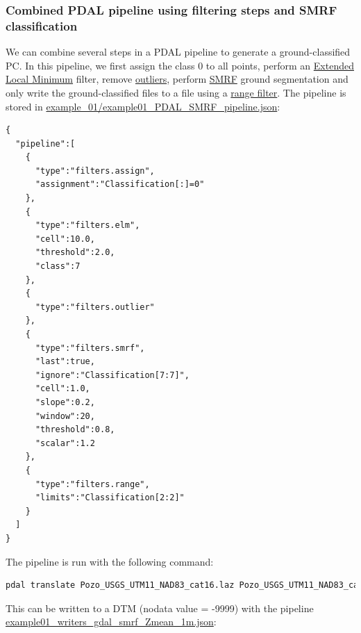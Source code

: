 \documentclass[a4paperpaper,,tablecaptionabove]{scrartcl}
\begin{document}
\hypertarget{combined-pdal-pipeline-using-filtering-steps-and-smrf-classification}{%
\subsubsection{Combined PDAL pipeline using filtering steps and SMRF
classification}\label{combined-pdal-pipeline-using-filtering-steps-and-smrf-classification}}

We can combine several steps in a PDAL pipeline to generate a
ground-classified PC. In this pipeline, we first assign the class 0 to
all points, perform an
\href{https://pdal.io/stages/filters.elm.html\#filters-elm}{Extended
Local Minimum} filter, remove
\href{https://pdal.io/stages/filters.outlier.html\#filters-outlier}{outliers},
perform
\href{https://pdal.io/stages/filters.smrf.html\#filters-smrf}{SMRF}
ground segmentation and only write the ground-classified files to a file
using a
\href{https://pdal.io/stages/filters.range.html\#filters-range}{range
filter}. The pipeline is stored in
\href{https://github.com/BodoBookhagen/PC_geomorph_roughness/blob/master/example_01/example01_PDAL_SMRF_pipeline.json}{example\_01/example01\_PDAL\_SMRF\_pipeline.json}:

\begin{lstlisting}
{
  "pipeline":[
    {
      "type":"filters.assign",
      "assignment":"Classification[:]=0"
    },
    {
      "type":"filters.elm",
      "cell":10.0,
      "threshold":2.0,
      "class":7
    },
    {
      "type":"filters.outlier"
    },
    {
      "type":"filters.smrf",
      "last":true,
      "ignore":"Classification[7:7]",
      "cell":1.0,
      "slope":0.2,
      "window":20,
      "threshold":0.8,
      "scalar":1.2
    },
    {
      "type":"filters.range",
      "limits":"Classification[2:2]"
    }
  ]
}
\end{lstlisting}

The pipeline is run with the following command:

\begin{lstlisting}[language=bash]
pdal translate Pozo_USGS_UTM11_NAD83_cat16.laz Pozo_USGS_UTM11_NAD83_cat16_SMRF_cl2.las --json example01_PDAL_SMRF_pipeline.json
\end{lstlisting}

This can be written to a DTM (nodata value = -9999) with the pipeline
\href{https://github.com/BodoBookhagen/PC_geomorph_roughness/blob/master/example_01/example01_writers_gdal_smrf_Zmean_1m.json}{example01\_writers\_gdal\_smrf\_Zmean\_1m.json}:
\end{document}
